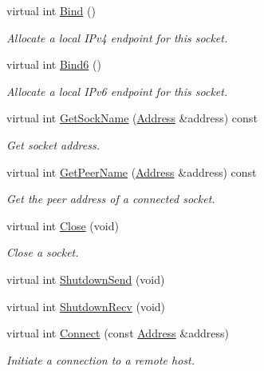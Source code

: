 \begin{DoxyCompactItemize}
virtual int \hyperlink{classns3_1_1Ipv4RawSocketImpl_a27cdb0c4cb9eb66cce01994bee87e3f5}{Bind} ()
\begin{DoxyCompactList}\small\item\em Allocate a local I\+Pv4 endpoint for this socket. \end{DoxyCompactList}\item 
virtual int \hyperlink{classns3_1_1Ipv4RawSocketImpl_acf7c964361e76d56b075187218ce2f79}{Bind6} ()
\begin{DoxyCompactList}\small\item\em Allocate a local I\+Pv6 endpoint for this socket. \end{DoxyCompactList}\item 
virtual int \hyperlink{classns3_1_1Ipv4RawSocketImpl_a4ac52521f511da9302c945d02ef07e23}{Get\+Sock\+Name} (\hyperlink{classns3_1_1Address}{Address} \&address) const 
\begin{DoxyCompactList}\small\item\em Get socket address. \end{DoxyCompactList}\item 
virtual int \hyperlink{classns3_1_1Ipv4RawSocketImpl_a04075494f8324b8b3ab2009d5a1d1544}{Get\+Peer\+Name} (\hyperlink{classns3_1_1Address}{Address} \&address) const 
\begin{DoxyCompactList}\small\item\em Get the peer address of a connected socket. \end{DoxyCompactList}\item 
virtual int \hyperlink{classns3_1_1Ipv4RawSocketImpl_a88af5a05d05f4fdfb38e1822040805e3}{Close} (void)
\begin{DoxyCompactList}\small\item\em Close a socket. \end{DoxyCompactList}\item 
virtual int \hyperlink{classns3_1_1Ipv4RawSocketImpl_a0d2cac5efa380545ea53036caf95eceb}{Shutdown\+Send} (void)
\item 
virtual int \hyperlink{classns3_1_1Ipv4RawSocketImpl_a196a3b1bc9339211fcaedb7ead4c5039}{Shutdown\+Recv} (void)
\item 
virtual int \hyperlink{classns3_1_1Ipv4RawSocketImpl_a2bcbab838c6120e3e8ac70fac807c168}{Connect} (const \hyperlink{classns3_1_1Address}{Address} \&address)
\begin{DoxyCompactList}\small\item\em Initiate a connection to a remote host. \end{DoxyCompactList}\item 

\end{DoxyCompactItemize}
